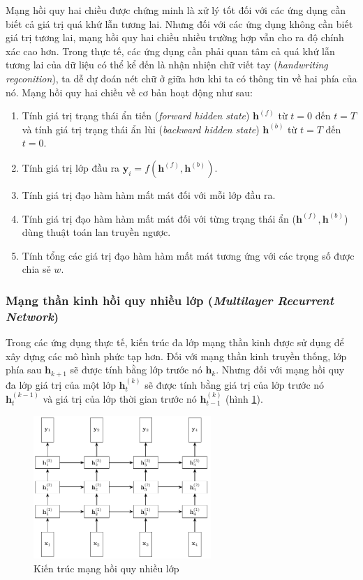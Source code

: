 Mạng hồi quy hai chiều được chứng minh là xử lý tốt đối với các ứng dụng cần biết cả giá trị quá khứ lẫn tương lai. Nhưng đối với các ứng dụng không cần biết giá trị tương lai, mạng hồi quy hai chiều nhiều trường hợp vẫn cho ra độ chính xác cao hơn. Trong thực tế, các ứng dụng cần phải quan tâm cả quá khứ lẫn tương lai của dữ liệu có thể kể đến là nhận nhiện chữ viết tay (\textit{handwriting regconition}), ta dễ dự đoán nét chữ ở giữa hơn khi ta có thông tin về hai phía của nó. Mạng hồi quy hai chiều về cơ bản hoạt động như sau:
\begin{enumerate}
    \item Tính giá trị trạng thái ẩn tiến (\textit{forward hidden state}) $\mathbf h^{(f)}$ từ $t=0$ đến $t=T$ và tính giá trị trạng thái ẩn lùi (\textit{backward hidden state}) $\mathbf h^{(b)}$ từ $t=T$ đến $t=0$.
    \item Tính giá trị lớp đầu ra $\mathbf y_i=f(\mathbf h^{(f)},\mathbf h^{(b)})$.
    \item Tính giá trị đạo hàm hàm mất mát đối với mỗi lớp đầu ra.
    \item Tính giá trị đạo hàm hàm mất mát đối với từng trạng thái ẩn ($\mathbf h^{(f)},\mathbf h^{(b)}$) dùng thuật toán lan truyền ngược.
    \item Tính tổng các giá trị đạo hàm hàm mất mát tương ứng với các trọng số được chia sẻ $w$.
\end{enumerate}

\subsubsection{Mạng thần kinh hồi quy nhiều lớp (\textit{Multilayer Recurrent Network})}
Trong các ứng dụng thực tế, kiến trúc đa lớp mạng thần kinh được sử dụng để xây dựng các mô hình phức tạp hơn. Đối với mạng thần kinh truyền thống, lớp phía sau $\mathbf h_{k+1}$ sẽ được tính bằng lớp trước nó $\mathbf h_k$. Nhưng đối với mạng hồi quy đa lớp giá trị của một lớp $\mathbf h^{(k)}_t$ sẽ được tính bằng giá trị của lớp trước nó $\mathbf h^{(k-1)}_t$ và giá trị của lớp thời gian trước nó $\mathbf h^{(k)}_{t-1}$ (hình \ref{figure:rnn-multi-layer-architecture}).
\begin{figure}[htb]
    \centering
    \includegraphics[width=0.6\textwidth]{tikz_image/rnn_multi_layer_architecture.pdf}
    \caption{Kiến trúc mạng hồi quy nhiều lớp}
    \label{figure:rnn-multi-layer-architecture}
\end{figure}

